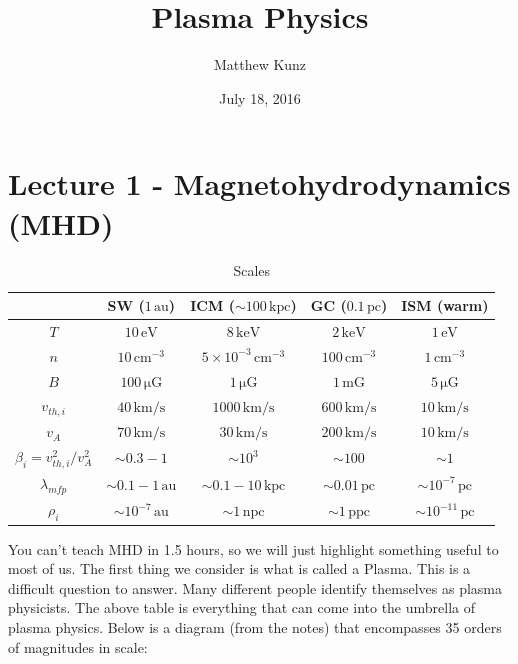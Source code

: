 \documentclass[letterpaper, 11pt]{article}
\numberwithin{equation}{section}
\numberwithin{figure}{section}
\begin{document}
\title{Plasma Physics}
\author{Matthew Kunz}
\date{July 18, 2016}

\maketitle

\section{Lecture 1 - Magnetohydrodynamics (MHD)}
\label{sec:lec1}

\begin{table}[h]
  \centering
  \begin{tabular}{|c|c|c|c|c|}
    \hline
    & SW ($1\,\mathrm{au}$) & ICM  ($\sim 100\,\mathrm{kpc}$) & GC ($0.1\,\mathrm{pc}$) & ISM (warm) \\ \hline
    $T$ & $10\,\mathrm{eV}$ & $8\,\mathrm{keV}$ & $2\,\mathrm{keV}$ & $1\,\mathrm{eV}$ \\ \hline
    $n$ & $10\,\mathrm{cm^{-3}}$& $5\times 10^{-3}\,\mathrm{cm^{-3}}$& $100\,\mathrm{cm^{-3}}$ & $1\,\mathrm{cm^{-3}}$ \\ \hline
    $B$ & $100\,\mathrm{\mu G}$ & $1\,\mathrm{\mu G}$ & $1\,\mathrm{mG}$ & $5\,\mathrm{\mu G}$ \\ \hline
    $v_{th,i}$ & $40\,\mathrm{km/s}$ & $1000\,\mathrm{km/s}$ & $600\,\mathrm{km/s}$ &  $10\,\mathrm{km/s}$ \\ \hline
    $v_{A}$ & $70\,\mathrm{km/s}$ & $30\,\mathrm{km/s}$ & $200\,\mathrm{km/s}$ & $10\,\mathrm{km/s}$ \\ \hline
    $\beta_i = v_{th,i}^2/v_A^2$ & $\sim 0.3-1$ & $\sim 10^3$ & $\sim 100$ & $\sim 1$ \\ \hline
    $\lambda_{mfp}$ & $\sim 0.1 - 1\,\mathrm{au}$ & $\sim 0.1 - 10\,\mathrm{kpc}$ & $\sim 0.01\,\mathrm{pc}$& $\sim 10^{-7}\,\mathrm{pc}$ \\ \hline
    $\rho_i$ & $\sim 10^{-7}\,\mathrm{au}$ & $\sim 1\,\mathrm{npc}$ & $\sim 1\,\mathrm{ppc}$ & $\sim 10^{-11}\,\mathrm{pc}$ \\ \hline
  \end{tabular}
  \caption{Scales}
  \label{tab:scales}
\end{table}

You can't teach MHD in 1.5 hours, so we will just highlight something useful to
most of us. The first thing we consider is what is called a Plasma. This is a
difficult question to answer. Many different people identify themselves as
plasma physicists. The above table is everything that can come into the umbrella
of plasma physics. Below is a diagram (from the notes) that encompasses 35
orders of magnitudes in scale:
\end{document}

